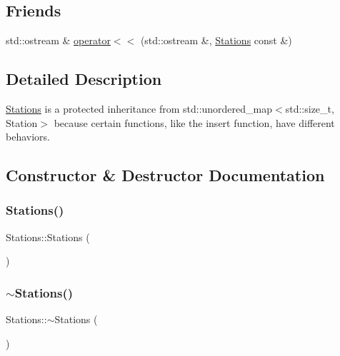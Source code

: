 \subsection*{Friends}
\begin{DoxyCompactItemize}
\item 
std\+::ostream \& \mbox{\hyperlink{class_stations_a6c2ba44849c083fa6d206d4573ea523e}{operator$<$$<$}} (std\+::ostream \&, \mbox{\hyperlink{class_stations}{Stations}} const \&)
\end{DoxyCompactItemize}


\subsection{Detailed Description}
\mbox{\hyperlink{class_stations}{Stations}} is a protected inheritance from std\+::unordered\+\_\+map$<$std\+::size\+\_\+t, Station$>$ because certain functions, like the insert function, have different behaviors. 

\subsection{Constructor \& Destructor Documentation}
\mbox{\label{class_stations_a4e0f8fc4709bd680154b7be896ca2350}} 
\subsubsection{\texorpdfstring{Stations()}{Stations()}}
{\footnotesize\ttfamily Stations\+::\+Stations (\begin{DoxyParamCaption}{ }\end{DoxyParamCaption})}

\mbox{\label{class_stations_a9d17c76f77babd7e88adf95112825b1d}} 
\subsubsection{\texorpdfstring{$\sim$\+Stations()}{~Stations()}}
{\footnotesize\ttfamily Stations\+::$\sim$\+Stations (\begin{DoxyParamCaption}{ }\end{DoxyParamCaption})\hspace{0.3cm}{\ttfamily [virtual]}}



